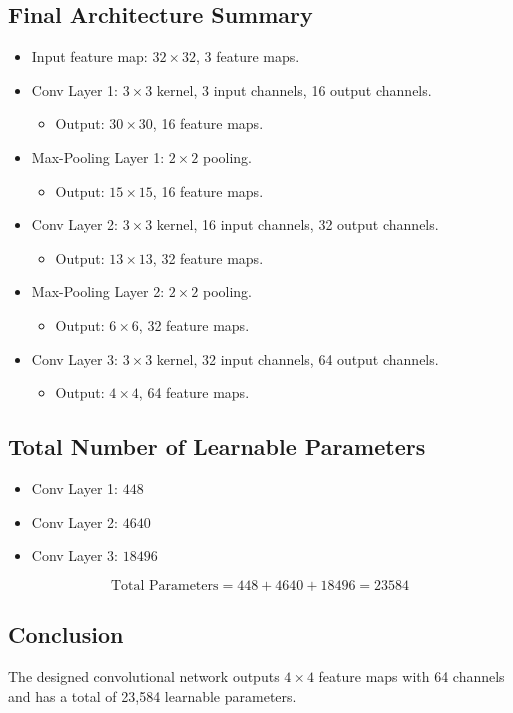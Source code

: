 \subsection*{Final Architecture Summary}
\begin{itemize}
    \item Input feature map: \( 32 \times 32 \), 3 feature maps.
    \item Conv Layer 1: \( 3 \times 3 \) kernel, 3 input channels, 16 output channels.
        \begin{itemize}
            \item Output: \( 30 \times 30 \), 16 feature maps.
        \end{itemize}
    \item Max-Pooling Layer 1: \( 2 \times 2 \) pooling.
        \begin{itemize}
            \item Output: \( 15 \times 15 \), 16 feature maps.
        \end{itemize}
    \item Conv Layer 2: \( 3 \times 3 \) kernel, 16 input channels, 32 output channels.
        \begin{itemize}
            \item Output: \( 13 \times 13 \), 32 feature maps.
        \end{itemize}
    \item Max-Pooling Layer 2: \( 2 \times 2 \) pooling.
        \begin{itemize}
            \item Output: \( 6 \times 6 \), 32 feature maps.
        \end{itemize}
    \item Conv Layer 3: \( 3 \times 3 \) kernel, 32 input channels, 64 output channels.
        \begin{itemize}
            \item Output: \( 4 \times 4 \), 64 feature maps.
        \end{itemize}
\end{itemize}

\subsection*{Total Number of Learnable Parameters}
\begin{itemize}
    \item Conv Layer 1: \( 448 \)
    \item Conv Layer 2: \( 4640 \)
    \item Conv Layer 3: \( 18496 \)
\end{itemize}
\[
\text{Total Parameters} = 448 + 4640 + 18496 = 23584
\]

\subsection*{Conclusion}
The designed convolutional network outputs \( 4 \times 4 \) feature maps with 64 channels and has a total of 23,584 learnable parameters.
